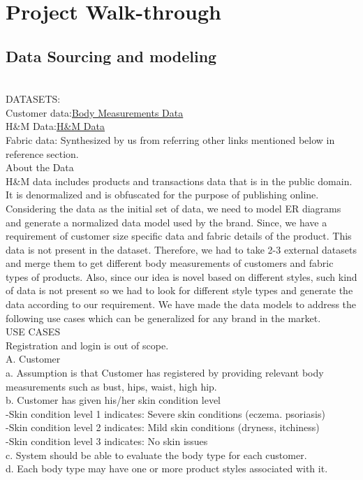 \documentclass[11pt,journal,compsoc]{IEEEtran}
\begin{document}
\section{Project Walk-through}
\subsection{Data Sourcing and modeling} \\
DATASETS:\\
Customer data:\href{https://data.mendeley.com/datasets/bjv6c9pmp4/1}{Body Measurements Data}\\
H&M Data:\href{https://www.kaggle.com/datasets/odins0n/hm256x256}{H&M Data}\\
Fabric data: Synthesized by us from referring other links mentioned below in reference section.\\

About the Data \\
H&M data includes products and transactions data that is in the public domain. It is denormalized and is obfuscated for the purpose of publishing online. Considering the data as the initial set of data, we need to model ER diagrams and generate a normalized data model used by the brand. Since, we have a requirement of customer size specific data and fabric details of the product. This data is not present in the dataset. Therefore, we had to take 2-3 external datasets and merge them to get different body measurements of customers and fabric types of products. Also, since our idea is novel based on different styles, such kind of data is not present so we had to look for different style types and generate the data according to our requirement. We have made the data models to address the following use cases which can be generalized for any brand in the market. \\

USE CASES \\
Registration and login is out of scope. \\
 A.  	Customer \\
a.   Assumption is that Customer has registered by providing relevant body measurements such as bust, hips, waist, high hip. \\
b.  Customer has given his/her skin condition level \\
-Skin condition level 1 indicates: Severe skin conditions (eczema. psoriasis) \\
-Skin condition level 2 indicates: Mild skin conditions (dryness, itchiness) \\
-Skin condition level 3 indicates: No skin issues \\
c.       System should be able to evaluate the body type for each customer. \\
d.       Each body type may have one or more product styles associated with it. \\
 
\end{document}
